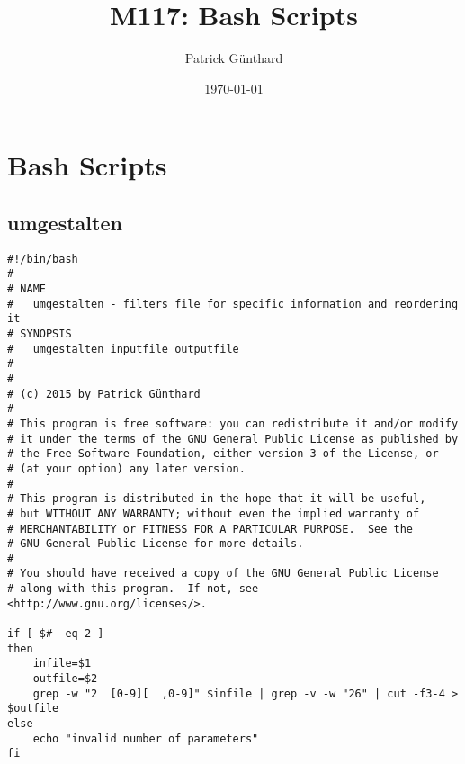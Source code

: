 \documentclass[11pt]{article}
\author{Patrick Günthard}
\date{\today}
\title{M117: Bash Scripts}
\begin{document}
\maketitle
\tableofcontents

\section{Bash Scripts}
\label{sec-1}
\subsection{umgestalten}
\label{sec-1-1}

\begin{verbatim}
#!/bin/bash
#
# NAME
#   umgestalten - filters file for specific information and reordering it
# SYNOPSIS
#   umgestalten inputfile outputfile
#
#
# (c) 2015 by Patrick Günthard
#
# This program is free software: you can redistribute it and/or modify
# it under the terms of the GNU General Public License as published by
# the Free Software Foundation, either version 3 of the License, or
# (at your option) any later version.
# 
# This program is distributed in the hope that it will be useful,
# but WITHOUT ANY WARRANTY; without even the implied warranty of
# MERCHANTABILITY or FITNESS FOR A PARTICULAR PURPOSE.  See the
# GNU General Public License for more details.
# 
# You should have received a copy of the GNU General Public License
# along with this program.  If not, see <http://www.gnu.org/licenses/>.

if [ $# -eq 2 ]
then
    infile=$1
    outfile=$2
    grep -w "2	[0-9][	,0-9]" $infile | grep -v -w "26" | cut -f3-4 > $outfile
else
    echo "invalid number of parameters"
fi
\end{verbatim}
\end{document}

